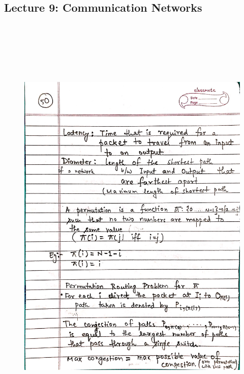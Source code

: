 \newpage
{\color{black} \subsection*{Lecture 9: Communication Networks}}
\begin{figure}[H]
    \centering
    \includegraphics[width=16cm, height=21cm]{"./MIT-6.042J/MIT-6042J-050"}
\end{figure}

